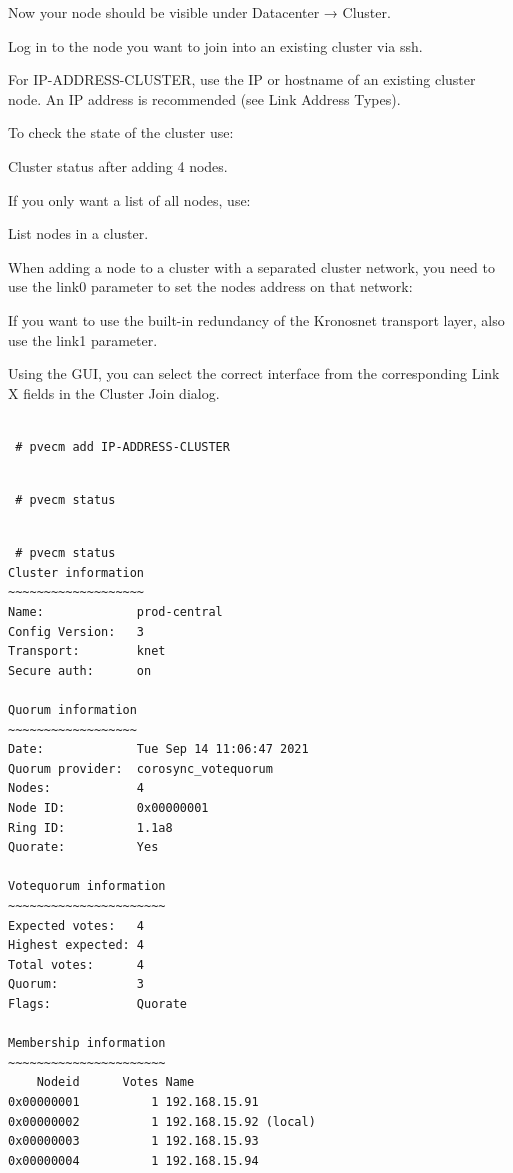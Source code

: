 Now your node should be visible under Datacenter → Cluster.

Log in to the node you want to join into an existing cluster via ssh.

For IP-ADDRESS-CLUSTER, use the IP or hostname of an existing cluster node. An IP address is recommended (see Link Address Types).

To check the state of the cluster use:

Cluster status after adding 4 nodes.

If you only want a list of all nodes, use:

List nodes in a cluster.

When adding a node to a cluster with a separated cluster network, you need to use the link0 parameter to set the nodes address on that network:

If you want to use the built-in redundancy of the Kronosnet transport layer, also use the link1 parameter.

Using the GUI, you can select the correct interface from the corresponding Link X fields in the Cluster Join dialog.

\begin{lstlisting}

 # pvecm add IP-ADDRESS-CLUSTER

\end{lstlisting}

\begin{lstlisting}

 # pvecm status

\end{lstlisting}

\begin{lstlisting}

 # pvecm status
Cluster information
~~~~~~~~~~~~~~~~~~~
Name:             prod-central
Config Version:   3
Transport:        knet
Secure auth:      on

Quorum information
~~~~~~~~~~~~~~~~~~
Date:             Tue Sep 14 11:06:47 2021
Quorum provider:  corosync_votequorum
Nodes:            4
Node ID:          0x00000001
Ring ID:          1.1a8
Quorate:          Yes

Votequorum information
~~~~~~~~~~~~~~~~~~~~~~
Expected votes:   4
Highest expected: 4
Total votes:      4
Quorum:           3
Flags:            Quorate

Membership information
~~~~~~~~~~~~~~~~~~~~~~
    Nodeid      Votes Name
0x00000001          1 192.168.15.91
0x00000002          1 192.168.15.92 (local)
0x00000003          1 192.168.15.93
0x00000004          1 192.168.15.94

\end{lstlisting}

